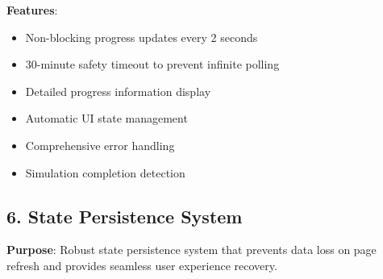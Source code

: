 \documentclass[12pt,a4paper]{article}
\begin{document}
\textbf{Features}:
\begin{itemize}
    \item Non-blocking progress updates every 2 seconds
    \item 30-minute safety timeout to prevent infinite polling
    \item Detailed progress information display
    \item Automatic UI state management
    \item Comprehensive error handling
    \item Simulation completion detection
\end{itemize}

\subsection{6. State Persistence System}

\textbf{Purpose}: Robust state persistence system that prevents data loss on page refresh and provides seamless user experience recovery.
\end{document}
